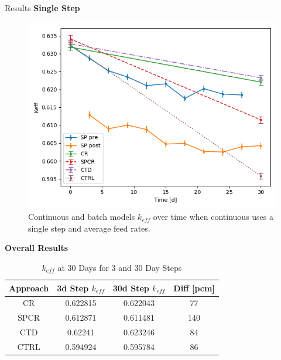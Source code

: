 \documentclass[final]{beamer}
\newlength{\onecolwid}
\newlength{\threecolwid}
\begin{document}
\begin{frame}[t]
\begin{columns}[t,totalwidth=\threecolwid]
\begin{column}{\onecolwid}
\begin{block}{Results}
\textbf{Single Step}
\begin{figure}
	\label{fig:keff_30d_batch}
	\includegraphics[width=0.9\linewidth]{images/cumulative_keff_coont.png}
	\caption{Continuous and batch models $k_{eff}$ over time when continuous uses a single step and average feed rates.}
\end{figure}


\textbf{Overall Results}

\begin{table}[H]
\renewcommand{\arraystretch}{1.25}
\caption{$k_{eff}$ at 30 Days for 3 and 30 Day Steps}
\label{tab:keff_vals}
\begin{tabular}{ | c | c | c | c | }
 \hline
 Approach & 3d Step $k_{eff}$ & 30d Step $k_{eff}$ & Diff [pcm]\\
 \hline
 \hline
 CR & 0.622815 & 0.622043 & 77\\
 SPCR & 0.612871 & 0.611481 & 140\\
 CTD & 0.62241 & 0.623246 & 84\\
 CTRL & 0.594924 & 0.595784 & 86\\

 \hline
\end{tabular}
\end{table}



\end{block}
\end{column}
\end{columns}
\end{frame}
\end{document}
